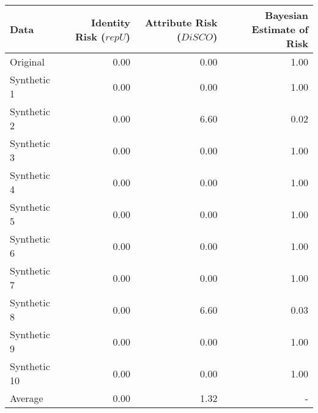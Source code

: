 \begin{tabular}{lrrr}
  \toprule
Data & Identity Risk ($repU$) & Attribute Risk ($DiSCO$) & Bayesian Estimate of Risk \\ 
  \midrule
Original & 0.00 & 0.00 & 1.00 \\ 
  Synthetic 1 & 0.00 & 0.00 & 1.00 \\ 
  Synthetic 2 & 0.00 & 6.60 & 0.02 \\ 
  Synthetic 3 & 0.00 & 0.00 & 1.00 \\ 
  Synthetic 4 & 0.00 & 0.00 & 1.00 \\ 
  Synthetic 5 & 0.00 & 0.00 & 1.00 \\ 
  Synthetic 6 & 0.00 & 0.00 & 1.00 \\ 
  Synthetic 7 & 0.00 & 0.00 & 1.00 \\ 
  Synthetic 8 & 0.00 & 6.60 & 0.03\\ 
  Synthetic 9 & 0.00 & 0.00 & 1.00 \\ 
  Synthetic 10 & 0.00 & 0.00 & 1.00 \\ 
  Average & 0.00 & 1.32 & - \\ 
   \bottomrule
\end{tabular}
